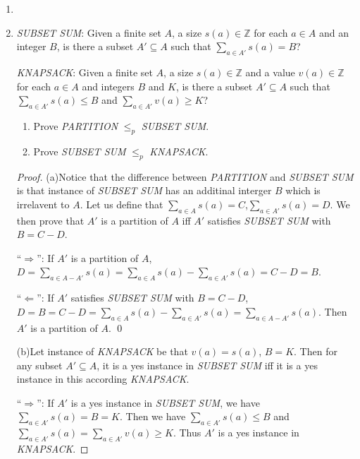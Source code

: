 \documentclass[12pt,a4paper]{article}
\makeatletter
\newtheorem*{solution}{Solution}
\theoremstyle{definition}
\renewenvironment{solution}[1][Solution] {\par\pushQED{\qed}\normalfont\topsep6\p@\@plus6\p@\relax\trivlist\item[\hskip\labelsep\bfseries#1\@addpunct{.}]\ignorespaces}{\popQED\endtrivlist\@endpefalse} \makeatother
\makeatother
\begin{document}
\begin{enumerate}
\begin{solution}
    \end{solution}

    \item
    \emph{SUBSET SUM}: Given a finite set $A$, a size $s(a) \in \mathbb{Z}$ for each $a \in A$ and an integer $B$, is there a subset $A' \subseteq A$ such that $\sum_{a \in A'}s(a) = B$?

    \emph{KNAPSACK}: Given a finite set $A$, a size $s(a) \in \mathbb{Z}$ and a value $v(a) \in \mathbb{Z}$ for each $a \in A$ and integers $B$ and $K$, is there a subset $A' \subseteq A$ such that $\sum_{a \in A'}s(a) \leq B$ and $\sum_{a \in A'}v(a) \geq K$?

    \begin{enumerate}
    \item
    Prove \emph{PARTITION} $\leq_p$ \emph{SUBSET SUM}.

    \item
    Prove \emph{SUBSET SUM} $\leq_p$ \emph{KNAPSACK}.

    \end{enumerate}
    
        \begin{proof}
            (a)Notice that the difference between \emph{PARTITION} and \emph{SUBSET SUM} is that instance of \emph{SUBSET SUM} has an additinal interger $B$ which is irrelavent to $A$. Let us define that $\sum\limits_{a\in A}s(a)=C$,$\sum\limits_{a\in A'}s(a)=D$. We then prove that $A'$ is a partition of $A$ iff $A'$ satisfies \emph{SUBSET SUM} with $B=C-D$.

            ``$\Rightarrow$'': If $A'$ is a partition of $A$, $D=\sum\limits_{a\in A-A'}s(a)=\sum\limits_{a\in A}s(a)-\sum\limits_{a\in A'}s(a)=C-D=B$.

            ``$\Leftarrow$'': If $A'$ satisfies \emph{SUBSET SUM} with $B=C-D$, $D=B=C-D=\sum\limits_{a\in A}s(a)-\sum\limits_{a\in A'}s(a)=\sum\limits_{a\in A-A'}s(a)$. Then $A'$ is a partition of $A$.
            \qed

            (b)Let instance of \emph{KNAPSACK} be that $v(a)=s(a)$, $B=K$. Then for any subset $A'\subseteq A$, it is a yes instance in \emph{SUBSET SUM} iff it is a yes instance in this according \emph{KNAPSACK}.

            ``$\Rightarrow$'': If $A'$ is a yes instance in \emph{SUBSET SUM}, we have $\sum\limits_{a \in A'}s(a) = B=K$. Then we have $\sum\limits_{a \in A'}s(a) \leq B$ and $\sum\limits_{a \in A'}s(a)=\sum\limits_{a \in A'}v(a)\geq K$. Thus $A'$ is a yes instance in \emph{KNAPSACK}.


\end{proof}
\end{enumerate}
\end{document}
